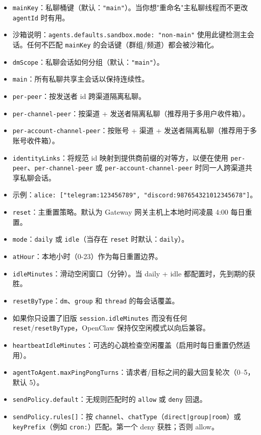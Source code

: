\begin{itemize}
  \item \texttt{mainKey}：私聊桶键（默认：\texttt{"main"}）。当你想"重命名"主私聊线程而不更改 \texttt{agentId} 时有用。
  \item 沙箱说明：\texttt{agents.defaults.sandbox.mode: "non-main"} 使用此键检测主会话。任何不匹配 \texttt{mainKey} 的会话键（群组/频道）都会被沙箱化。
  \item \texttt{dmScope}：私聊会话如何分组（默认：\texttt{"main"}）。
  \item \texttt{main}：所有私聊共享主会话以保持连续性。
  \item \texttt{per-peer}：按发送者 id 跨渠道隔离私聊。
  \item \texttt{per-channel-peer}：按渠道 + 发送者隔离私聊（推荐用于多用户收件箱）。
  \item \texttt{per-account-channel-peer}：按账号 + 渠道 + 发送者隔离私聊（推荐用于多账号收件箱）。
  \item \texttt{identityLinks}：将规范 id 映射到提供商前缀的对等方，以便在使用 \texttt{per-peer}、\texttt{per-channel-peer} 或 \texttt{per-account-channel-peer} 时同一人跨渠道共享私聊会话。
  \item 示例：\texttt{alice: ["telegram:123456789", "discord:987654321012345678"]}。
  \item \texttt{reset}：主重置策略。默认为 Gateway 网关主机上本地时间凌晨 4:00 每日重置。
  \item \texttt{mode}：\texttt{daily} 或 \texttt{idle}（当存在 \texttt{reset} 时默认：\texttt{daily}）。
  \item \texttt{atHour}：本地小时（0-23）作为每日重置边界。
  \item \texttt{idleMinutes}：滑动空闲窗口（分钟）。当 daily + idle 都配置时，先到期的获胜。
  \item \texttt{resetByType}：\texttt{dm}、\texttt{group} 和 \texttt{thread} 的每会话覆盖。
  \item 如果你只设置了旧版 \texttt{session.idleMinutes} 而没有任何 \texttt{reset}/\texttt{resetByType}，OpenClaw 保持仅空闲模式以向后兼容。
  \item \texttt{heartbeatIdleMinutes}：可选的心跳检查空闲覆盖（启用时每日重置仍然适用）。
  \item \texttt{agentToAgent.maxPingPongTurns}：请求者/目标之间的最大回复轮次（0–5，默认 5）。
  \item \texttt{sendPolicy.default}：无规则匹配时的 \texttt{allow} 或 \texttt{deny} 回退。
  \item \texttt{sendPolicy.rules[]}：按 \texttt{channel}、\texttt{chatType}（\texttt{direct|group|room}）或 \texttt{keyPrefix}（例如 \texttt{cron:}）匹配。第一个 deny 获胜；否则 allow。
\end{itemize}


